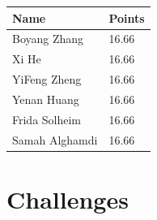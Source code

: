 \documentclass{article}
\begin{document}
\begin{center}
\begin{tabular}{ | m{3cm}| m{1.3cm} | }
\hline
\textbf{Name} & \textbf{Points}  \\
\hline
Boyang Zhang & 16.66  \\
\hline
Xi He & 16.66  \\
\hline
YiFeng Zheng & 16.66 \\
\hline
Yenan Huang & 16.66 \\
\hline
Frida Solheim & 16.66 \\
\hline
Samah Alghamdi & 16.66 \\
\hline
\end{tabular}
\end{center}


\section{Challenges}
\end{document}
